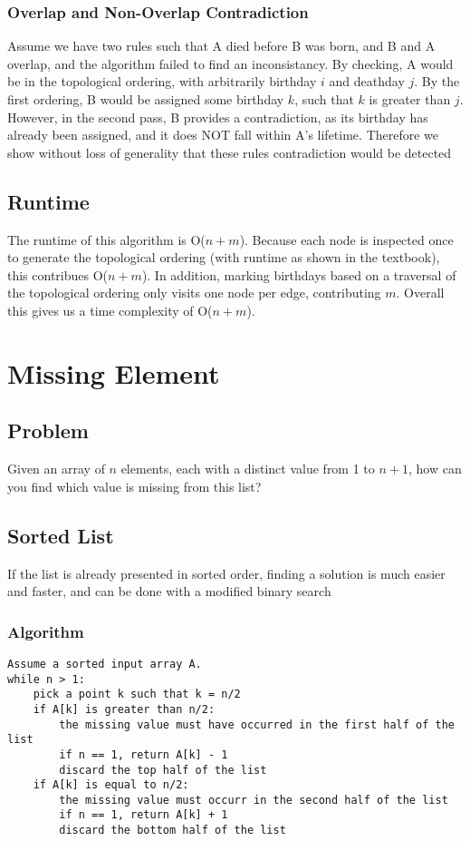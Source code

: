 \documentclass[titlepage]{article}
\numberwithin{equation}{subsection}
\begin{document}
\subsubsection{Overlap and Non-Overlap Contradiction}
Assume we have two rules such that A died before B was born, and B and A overlap,
and the algorithm failed to find an inconsistancy. By checking, A would be in the 
topological ordering, with arbitrarily birthday $i$ and deathday $j$. By the first ordering,
B would be assigned some birthday $k$, such that $k$ is greater than $j$. However, in the
second pass, B provides a contradiction, as its birthday has already been assigned, and it
does NOT fall within A's lifetime. Therefore we show without loss of generality that
these rules contradiction would be detected

\subsection{Runtime}
The runtime of this algorithm is O($n+m$). Because each node is inspected once to generate
the topological ordering (with runtime as shown in the textbook), this contribues O($n+m$).
In addition, marking birthdays based on a traversal of the topological ordering only
visits one node per edge, contributing $m$. Overall this gives us a time complexity of O($n+m$).
\section{Missing Element}
\subsection{Problem}
Given an array of $n$ elements, each with a distinct value from
1 to $n+1$, how can you find which value is missing from this list?
\subsection{Sorted List}
If the list is already presented in sorted order, finding a solution
is much easier and faster, and can be done with a modified binary search
\subsubsection{Algorithm}
\begin{minipage}{\linewidth}
\begin{lstlisting}
Assume a sorted input array A.
while n > 1:
    pick a point k such that k = n/2
    if A[k] is greater than n/2:
        the missing value must have occurred in the first half of the list
        if n == 1, return A[k] - 1
        discard the top half of the list
    if A[k] is equal to n/2:
        the missing value must occurr in the second half of the list
        if n == 1, return A[k] + 1
        discard the bottom half of the list
\end{lstlisting}
\end{minipage}
\end{document}
